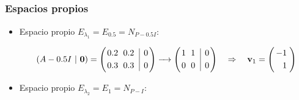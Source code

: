 
\subsection{}


	\begin{frame}\frametitle{Espacios propios}
		
		\begin{itemize}
			\item Espacio propio $E_{\lambda_1}=E_{0.5}=N_{P-0.5I}$:
			
			\[				
			(A-0.5I \ | \ \mathbf{0})
			=
			\left(
			\begin{array}{@{\hspace{0.2\tabcolsep}}r@{\hspace{\tabcolsep}}r@{\hspace{\tabcolsep}}|r@{\hspace{0.2\tabcolsep}}}
			0.2 & 0.2 & 0  \\[1mm]
			0.3 & 0.3 & 0
			\end{array}
			\right) 
			\xrightarrow[]{\phantom{xx} }		
			\left(
			\begin{array}{@{\hspace{0.2\tabcolsep}}r@{\hspace{\tabcolsep}}r@{\hspace{\tabcolsep}}|r@{\hspace{0.2\tabcolsep}}}
			1 & 1 & 0  \\[1mm]
			0 & 0 & 0
			\end{array}
			\right) 
			\quad \Rightarrow \quad 
			\mathbf{v}_1 = 
			\left(
			\begin{array}{@{\hspace{0.3\tabcolsep}}r@{\hspace{0.5\tabcolsep}}}
			-1   \\[1mm]
			 1 
			\end{array}
			\right) 
			\]
			
			\vspace{6mm}
			\item  Espacio propio $E_{\lambda_2}=E_{1}=N_{P-I}$:
			

\end{itemize}
\end{frame}
